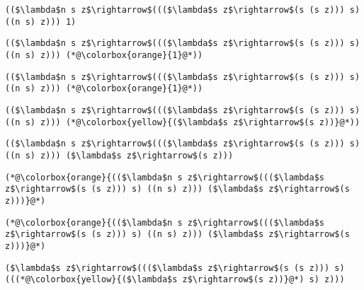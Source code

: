 \documentclass{beamer}
\begin{document}
\begin{frame}[fragile]{\CurrentSection}
\lstset{basicstyle=\ttfamily\small}\lstset{numbers=none}\lstset{language=ML}\begin{lstlisting}
(($\lambda$n s z$\rightarrow$((($\lambda$s z$\rightarrow$(s (s z))) s) ((n s) z))) 1)
\end{lstlisting}
\pause\lstset{language=ML}\begin{lstlisting}
(($\lambda$n s z$\rightarrow$((($\lambda$s z$\rightarrow$(s (s z))) s) ((n s) z))) (*@\colorbox{orange}{1}@*))
\end{lstlisting}

\end{frame}

\begin{frame}[fragile]{\CurrentSection}
\lstset{basicstyle=\ttfamily\small}\lstset{numbers=none}\lstset{language=ML}\begin{lstlisting}
(($\lambda$n s z$\rightarrow$((($\lambda$s z$\rightarrow$(s (s z))) s) ((n s) z))) (*@\colorbox{orange}{1}@*))
\end{lstlisting}
\pause\lstset{language=ML}\begin{lstlisting}
(($\lambda$n s z$\rightarrow$((($\lambda$s z$\rightarrow$(s (s z))) s) ((n s) z))) (*@\colorbox{yellow}{($\lambda$s z$\rightarrow$(s z))}@*))
\end{lstlisting}

\end{frame}

\begin{frame}[fragile]{\CurrentSection}
\lstset{basicstyle=\ttfamily\small}\lstset{numbers=none}\lstset{language=ML}\begin{lstlisting}
(($\lambda$n s z$\rightarrow$((($\lambda$s z$\rightarrow$(s (s z))) s) ((n s) z))) ($\lambda$s z$\rightarrow$(s z)))
\end{lstlisting}
\pause\lstset{language=ML}\begin{lstlisting}
(*@\colorbox{orange}{(($\lambda$n s z$\rightarrow$((($\lambda$s z$\rightarrow$(s (s z))) s) ((n s) z))) ($\lambda$s z$\rightarrow$(s z)))}@*)
\end{lstlisting}

\end{frame}

\begin{frame}[fragile]{\CurrentSection}
\lstset{basicstyle=\ttfamily\small}\lstset{numbers=none}\lstset{language=ML}\begin{lstlisting}
(*@\colorbox{orange}{(($\lambda$n s z$\rightarrow$((($\lambda$s z$\rightarrow$(s (s z))) s) ((n s) z))) ($\lambda$s z$\rightarrow$(s z)))}@*)
\end{lstlisting}
\pause\lstset{language=ML}\begin{lstlisting}
($\lambda$s z$\rightarrow$((($\lambda$s z$\rightarrow$(s (s z))) s) (((*@\colorbox{yellow}{($\lambda$s z$\rightarrow$(s z))}@*) s) z)))
\end{lstlisting}

\end{frame}
\end{document}
